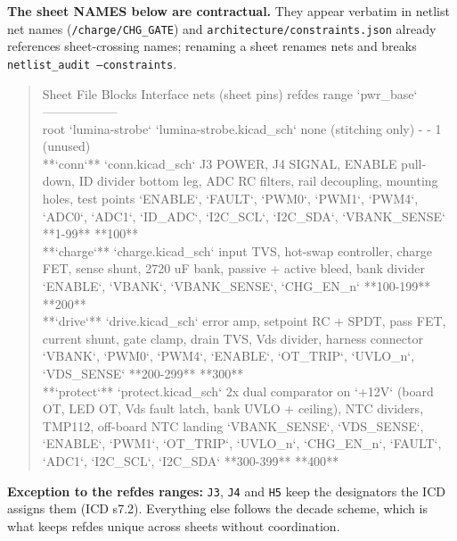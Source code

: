 \documentclass[11pt,a4paper]{article}
\begin{document}
\textbf{The sheet NAMES below are contractual.} They appear verbatim in netlist net names (\texttt{/charge/CHG\_GATE}) and \texttt{architecture/constraints.json} already references sheet-crossing names; renaming a sheet renames nets and breaks \texttt{netlist\_audit --constraints}.

\begin{quote}\small\ttfamily\raggedright
\textbar{} Sheet \textbar{} File \textbar{} Blocks \textbar{} Interface nets (sheet pins) \textbar{} refdes range \textbar{} `pwr\_base` \textbar{}\\
\textbar{}---\textbar{}---\textbar{}---\textbar{}---\textbar{}---\textbar{}---\textbar{}\\
\textbar{} root `lumina-strobe` \textbar{} `lumina-strobe.kicad\_sch` \textbar{} none (stitching only) \textbar{} - \textbar{} - \textbar{} 1 (unused) \textbar{}\\
\textbar{} {*}{*}`conn`{*}{*} \textbar{} `conn.kicad\_sch` \textbar{} J3 POWER, J4 SIGNAL, ENABLE pull-down, ID divider bottom leg, ADC RC filters, rail decoupling, mounting holes, test points \textbar{} `ENABLE`, `FAULT`, `PWM0`, `PWM1`, `PWM4`, `ADC0`, `ADC1`, `ID\_ADC`, `I2C\_SCL`, `I2C\_SDA`, `VBANK\_SENSE` \textbar{} {*}{*}1-99{*}{*} \textbar{} {*}{*}100{*}{*} \textbar{}\\
\textbar{} {*}{*}`charge`{*}{*} \textbar{} `charge.kicad\_sch` \textbar{} input TVS, hot-swap controller, charge FET, sense shunt, 2720 uF bank, passive + active bleed, bank divider \textbar{} `ENABLE`, `VBANK`, `VBANK\_SENSE`, `CHG\_EN\_n` \textbar{} {*}{*}100-199{*}{*} \textbar{} {*}{*}200{*}{*} \textbar{}\\
\textbar{} {*}{*}`drive`{*}{*} \textbar{} `drive.kicad\_sch` \textbar{} error amp, setpoint RC + SPDT, pass FET, current shunt, gate clamp, drain TVS, Vds divider, harness connector \textbar{} `VBANK`, `PWM0`, `PWM4`, `ENABLE`, `OT\_TRIP`, `UVLO\_n`, `VDS\_SENSE` \textbar{} {*}{*}200-299{*}{*} \textbar{} {*}{*}300{*}{*} \textbar{}\\
\textbar{} {*}{*}`protect`{*}{*} \textbar{} `protect.kicad\_sch` \textbar{} 2x dual comparator on `+12V` (board OT, LED OT, Vds fault latch, bank UVLO + ceiling), NTC dividers, TMP112, off-board NTC landing \textbar{} `VBANK\_SENSE`, `VDS\_SENSE`, `ENABLE`, `PWM1`, `OT\_TRIP`, `UVLO\_n`, `CHG\_EN\_n`, `FAULT`, `ADC1`, `I2C\_SCL`, `I2C\_SDA` \textbar{} {*}{*}300-399{*}{*} \textbar{} {*}{*}400{*}{*} \textbar{}
\end{quote}
\textbf{Exception to the refdes ranges:} \texttt{J3}, \texttt{J4} and \texttt{H5} keep the designators the ICD assigns them (ICD s7.2). Everything else follows the decade scheme, which is what keeps refdes unique across sheets without coordination.
\end{document}

